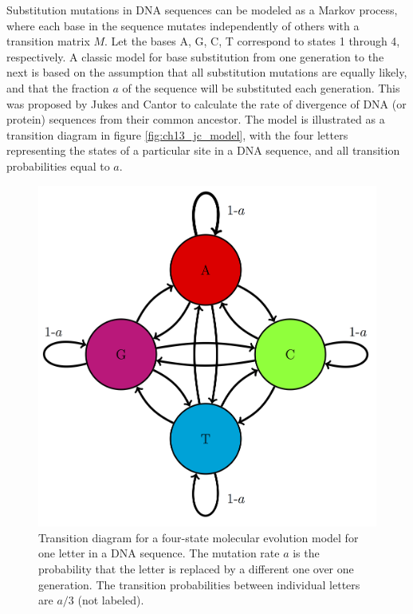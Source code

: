 \documentclass[
  letterpaper,
  DIV=11,
  numbers=noendperiod]{scrreprt}
\begin{document}
Substitution mutations in DNA sequences can be modeled as a Markov
process, where each base in the sequence mutates independently of others
with a transition matrix \(M\). Let the bases A, G, C, T correspond to
states 1 through 4, respectively. A classic model for base substitution
from one generation to the next is based on the assumption that all
substitution mutations are equally likely, and that the fraction \(a\)
of the sequence will be substituted each generation. This was proposed
by Jukes and Cantor \cite{jukes_evolution_1969} to calculate the rate of
divergence of DNA (or protein) sequences from their common ancestor. The
model is illustrated as a transition diagram in figure
\ref{fig:ch13_jc_model}, with the four letters representing the states
of a particular site in a DNA sequence, and all transition probabilities
equal to \(a\).

\begin{figure}

{\centering \includegraphics{./ch13/JC_trans_diag.png}

}

\caption{Transition diagram for a four-state molecular evolution
model for one letter in a DNA sequence. The
mutation rate \(a\) is the probability that the letter is replaced by a
different one over one generation. The transition probabilities between
individual letters are \(a/3\) (not labeled).}

\end{figure}
\end{document}

